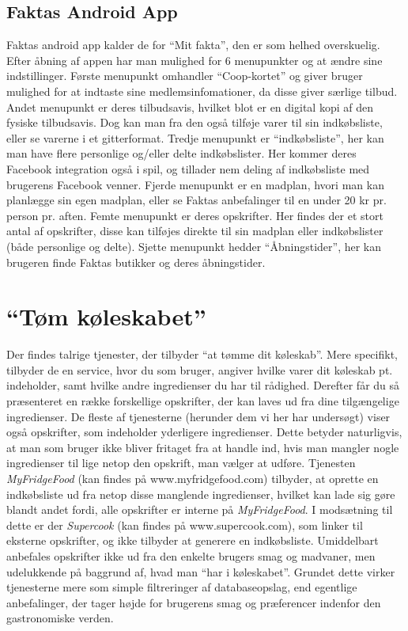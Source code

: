 	\subsection{Faktas Android App}
		Faktas android app kalder de for ``Mit fakta'', den er som helhed overskuelig.
		Efter åbning af appen har man mulighed for 6 menupunkter og at ændre sine indstillinger.
		Første menupunkt omhandler ``Coop-kortet'' og giver bruger mulighed for at indtaste sine medlemsinfomationer, da disse giver særlige tilbud.
		Andet menupunkt er deres tilbudsavis, hvilket blot er en digital kopi af den fysiske tilbudsavis. 
		Dog kan man fra den også tilføje varer til sin indkøbsliste, eller se varerne i et gitterformat.
		Tredje menupunkt er ``indkøbsliste'', her kan man have flere personlige og/eller delte indkøbslister.
		Her kommer deres Facebook integration også i spil, og tillader nem deling af indkøbsliste med brugerens Facebook venner.
		Fjerde menupunkt er en madplan, hvori man kan planlægge sin egen madplan, eller se Faktas anbefalinger til en under 20 kr pr. person pr. aften.
		Femte menupunkt er deres opskrifter.
		Her findes der et stort antal af opskrifter, disse kan tilføjes direkte til sin madplan eller indkøbslister (både personlige og delte).
		Sjette menupunkt hedder ``Åbningstider'', her kan brugeren finde Faktas butikker og deres åbningstider. 


\section{``Tøm køleskabet''}
Der findes talrige tjenester, der tilbyder “at tømme dit køleskab”. 
Mere specifikt, tilbyder de en service, hvor du som bruger, angiver hvilke varer dit køleskab pt. indeholder, samt hvilke andre ingredienser du har til rådighed. 
Derefter får du så præsenteret en række forskellige opskrifter, der kan laves ud fra dine tilgængelige ingredienser. 
De fleste af tjenesterne (herunder dem vi her har undersøgt) viser også opskrifter, som indeholder yderligere ingredienser. 
Dette betyder naturligvis, at man som bruger ikke bliver fritaget fra at handle ind, hvis man mangler nogle ingredienser til lige netop den opskrift, man vælger at udføre. 
Tjenesten \textit{MyFridgeFood} (kan findes på www.myfridgefood.com) tilbyder, at oprette en indkøbsliste ud fra netop disse manglende ingredienser, hvilket kan lade sig gøre blandt andet fordi, alle opskrifter er interne på \textit{MyFridgeFood}. 
I modsætning til dette er der \textit{Supercook} (kan findes på www.supercook.com), som linker til eksterne opskrifter, og ikke tilbyder at generere en indkøbsliste. 
Umiddelbart anbefales opskrifter ikke ud fra den enkelte brugers smag og madvaner, men udelukkende på baggrund af, hvad man “har i køleskabet”. 
Grundet dette virker tjenesterne mere som simple filtreringer af databaseopslag, end egentlige anbefalinger, der tager højde for brugerens smag og præferencer indenfor den gastronomiske verden.


